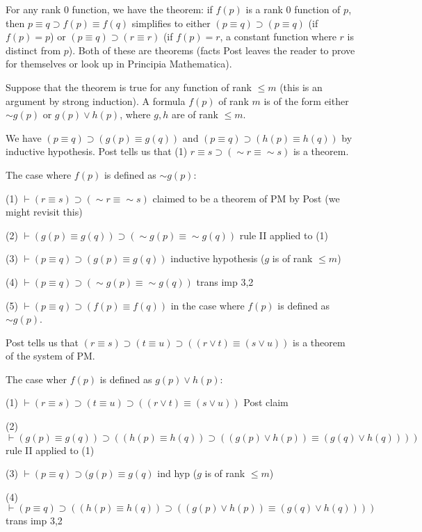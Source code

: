 \documentclass[12pt]{article}
\begin{document}
For any rank $0$ function, we have the theorem:  if $f(p)$ is a rank 0 function of $p$, then $p \equiv q \supset f(p) \equiv f(q)$ simplifies to either $(p \equiv q) \supset (p \equiv q)$ (if $f(p) = p$) or $(p \equiv q) \supset (r \equiv r)$  (if $f(p) = r$, a constant function where $r$ is distinct from $p$).
Both of these are theorems (facts Post leaves the reader to prove for themselves or look up in Principia Mathematica).

Suppose that the theorem is true for any function of rank $\leq m$ (this is an argument by strong induction).  A formula $f(p)$ of rank $m$ is of the form either $\sim g(p)$ or $g(p) \vee h(p)$, where $g,h$ are of rank $\leq m$.

We have $(p \equiv q) \supset (g(p) \equiv g(q))$ and  $(p \equiv q) \supset (h(p) \equiv h(q))$ by inductive hypothesis.  Post tells us that (1) $r \equiv s \supset (\sim r \equiv \sim s)$ is a theorem.

The case where $f(p)$ is defined as $\sim g(p)$:

(1) $\vdash (r \equiv s) \supset (\sim r \equiv \sim s)$ claimed to be a theorem of PM by Post (we might revisit this)

(2) $\vdash (g(p) \equiv g(q)) \supset (\sim g(p) \equiv \sim g(q))$  rule II applied to (1)

(3) $\vdash (p \equiv q) \supset (g(p) \equiv g(q))$ inductive hypothesis ($g$ is of rank $\leq m$)

(4) $\vdash (p \equiv q) \supset (\sim g(p) \equiv \sim g(q))$  trans imp 3,2

(5) $\vdash (p \equiv q) \supset (f(p) \equiv f(q))$ in the case where $f(p)$ is defined as $\sim g(p)$.

Post tells us that $(r\equiv s) \supset  (t\equiv u) \supset ((r \vee t) \equiv (s \vee u))$ is a theorem of the system of PM.

The case wher $f(p)$ is defined as $g(p) \vee h(p)$:

(1) $\vdash (r\equiv s) \supset  (t\equiv u) \supset ((r \vee t) \equiv (s \vee u))$ Post claim

(2)  $\vdash (g(p) \equiv g(q)) \supset ((h(p) \equiv h(q)) \supset ((g(p) \vee h(p)) \equiv (g(q) \vee h(q))))$  rule II applied to (1)

(3) $\vdash (p \equiv q) \supset (g(p) \equiv g(q)$  ind hyp ($g$ is of rank $\leq m$)

(4)  $\vdash (p \equiv q) \supset ((h(p) \equiv h(q)) \supset ((g(p) \vee h(p)) \equiv (g(q) \vee h(q))))$  trans imp 3,2
\end{document}
